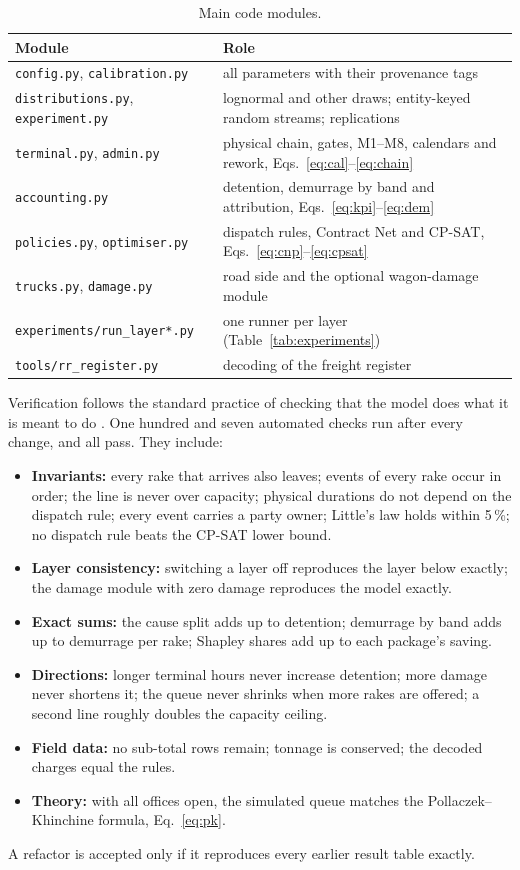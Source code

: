 \begin{table}[!htbp]
\centering
\caption[Main code modules]{Main code modules.}
\label{tab:code}
\small
\begin{tabularx}{\textwidth}{@{}l X@{}}
\toprule
\textbf{Module} & \textbf{Role} \\
\midrule
\texttt{config.py}, \texttt{calibration.py} & all parameters with their provenance tags \\
\texttt{distributions.py}, \texttt{experiment.py} & lognormal and other draws; entity-keyed random streams; replications \\
\texttt{terminal.py}, \texttt{admin.py} & physical chain, gates, M1--M8, calendars and rework, Eqs.~\eqref{eq:cal}--\eqref{eq:chain} \\
\texttt{accounting.py} & detention, demurrage by band and attribution, Eqs.~\eqref{eq:kpi}--\eqref{eq:dem} \\
\texttt{policies.py}, \texttt{optimiser.py} & dispatch rules, Contract Net and CP-SAT, Eqs.~\eqref{eq:cnp}--\eqref{eq:cpsat} \\
\texttt{trucks.py}, \texttt{damage.py} & road side and the optional wagon-damage module \\
\texttt{experiments/run\_layer*.py} & one runner per layer (Table~\ref{tab:experiments}) \\
\texttt{tools/rr\_register.py} & decoding of the freight register \\
\bottomrule
\end{tabularx}
\end{table}

Verification follows the standard practice of checking that the model does what it is meant to do \cite{sargent}. One hundred and seven automated checks run after every change, and all pass. They include:
\begin{itemize}
    \item \textbf{Invariants:} every rake that arrives also leaves; events of every rake occur in order; the line is never over capacity; physical durations do not depend on the dispatch rule; every event carries a party owner; Little's law holds within 5\,\%; no dispatch rule beats the CP-SAT lower bound.
    \item \textbf{Layer consistency:} switching a layer off reproduces the layer below exactly; the damage module with zero damage reproduces the model exactly.
    \item \textbf{Exact sums:} the cause split adds up to detention; demurrage by band adds up to demurrage per rake; Shapley shares add up to each package's saving.
    \item \textbf{Directions:} longer terminal hours never increase detention; more damage never shortens it; the queue never shrinks when more rakes are offered; a second line roughly doubles the capacity ceiling.
    \item \textbf{Field data:} no sub-total rows remain; tonnage is conserved; the decoded charges equal the rules.
    \item \textbf{Theory:} with all offices open, the simulated queue matches the Pollaczek--Khinchine formula, Eq.~\eqref{eq:pk}.
\end{itemize}
A refactor is accepted only if it reproduces every earlier result table exactly.
